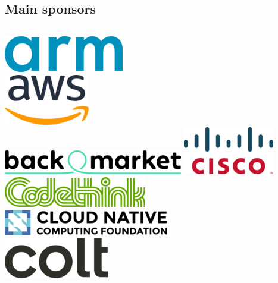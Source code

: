 \documentclass[aspectratio=169]{beamer}
\begin{document}
\subsection{Main sponsors}

\begin{frame}
	\begin{columns}[t]
	\centering
		\includegraphics[scale=0.5]{images/arm.png}\\
		\vspace{0.4cm}
		\includegraphics[scale=0.5]{images/aws.png}\\
		\vspace{0.4cm}
		\includegraphics[scale=0.3]{images/backmarket.png}
		\vspace{0.4cm}
		\includegraphics[scale=0.5]{images/cisco.png}\\
	\centering
		\includegraphics[scale=0.5]{images/codethink.png}
		\vspace{0.4cm}
		\includegraphics[scale=0.4]{images/cncf.png}\\
		\vspace{0.4cm}
		\includegraphics[scale=0.2]{images/colt.png}\\

\end{columns}
\end{frame}
\end{document}
